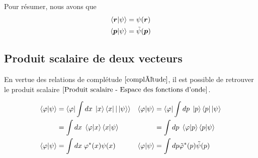 \documentclass[../Notesdecours.tex]{subfiles}
\begin{document}
Pour résumer, nous avons que 
\begin{align}
\braket{\bm{r}|\psi} &= \psi(\bm{r})\\
\braket{\bm{p}|\psi} &= \tilde{\psi}(\bm{p})
\end{align}
\subsection{Produit scalaire de deux vecteurs}
En vertue des relations de complétude $\ref{complétude}$, il est possible de retrouver le produit scalaire $\eqref{Produit scalaire - Espace des fonctions d'onde}$.

\begin{align}
\braket{\varphi|\psi} &= \braket{\varphi|\int dx \; \ket{x}\bra{x}|\ket{\psi}} & \braket{\varphi|\psi} &= \braket{\varphi|\int dp \; \ket{p}\bra{p}|\psi}\notag\\
&= \int dx \; \braket{\varphi|x}\braket{x|\psi} & &= \int dp \; \braket{\varphi|p}\braket{p|\psi}\notag\\
\braket{\varphi|\psi} &= \int dx \; \varphi^*(x) \psi (x) & \braket{\varphi|\psi} &= \int dp \tilde{\varphi}^* (p) \tilde{\psi}(p) 
\end{align}
\end{document}
